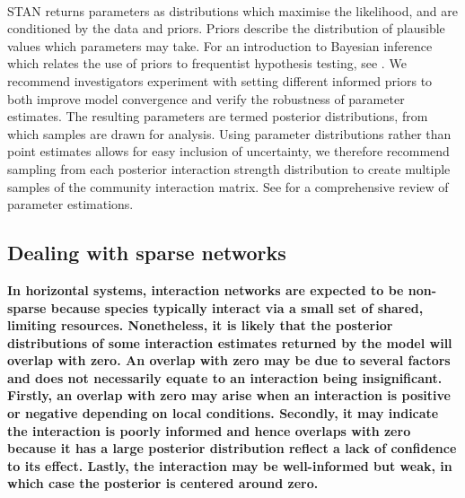 \documentclass[a4,12pt]{article}
\begin{document}
\begin{refsection}
        \paragraph{}
        STAN returns parameters as distributions which maximise the likelihood, and are conditioned by the data and priors. Priors describe the distribution of plausible values which parameters may take. For an introduction to Bayesian inference which relates the use of priors to frequentist hypothesis testing, see \textcite{Ellison1996}. We recommend investigators experiment with setting different informed priors to both improve model convergence and verify the robustness of parameter estimates. The resulting parameters are termed posterior distributions, from which samples are drawn for analysis. Using parameter distributions rather than point estimates allows for easy inclusion of uncertainty, we therefore recommend sampling from each posterior interaction strength distribution to create multiple samples of the community interaction matrix. See \textcite{Ellison2004} for a comprehensive review of parameter estimations.

    \subsection{Dealing with sparse networks}
    \label{meth:sparse}

    \textbf{In horizontal systems, interaction networks are expected to be non-sparse because species typically interact via a small set of shared, limiting resources. Nonetheless, it is likely that the posterior distributions of some interaction estimates returned by the model will overlap with zero. An overlap with zero may be due to several factors and does not necessarily equate to an interaction being insignificant. Firstly, an overlap with zero may arise when an interaction is positive or negative depending on local conditions. Secondly, it may indicate the interaction is poorly informed and hence overlaps with zero because it has a large posterior distribution reflect a lack of confidence to its effect. Lastly, the interaction may be well-informed but weak, in which case the posterior is centered around zero.}


\end{refsection}
\end{document}
